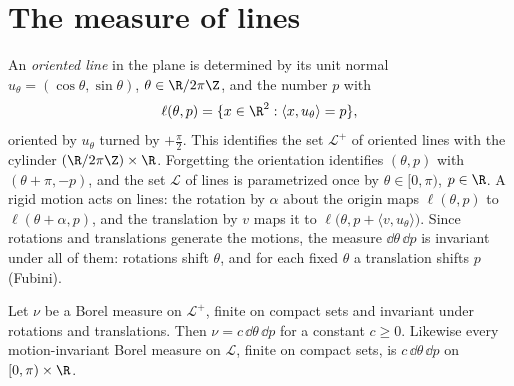 \section{The measure of lines}

An \emph{oriented line} in the plane is determined by its unit normal $u_\theta=(\cos\theta,\sin\theta)$, $\theta\in\R/2\pi\Z$, and the number $p$ with
\[\ell(\theta,p)=\{x\in\R^2:\langle x,u_\theta\rangle=p\},\]
oriented by $u_\theta$ turned by $+\frac\pi2$. This identifies the set $\mathcal L^+$ of oriented lines with the cylinder $(\R/2\pi\Z)\times\R$. Forgetting the orientation identifies
$(\theta,p)$ with $(\theta+\pi,-p)$, and the set $\mathcal L$ of lines is parametrized once by $\theta\in[0,\pi)$, $p\in\R$. A rigid motion acts on lines: the rotation by $\alpha$ about the
origin maps $\ell(\theta,p)$ to $\ell(\theta+\alpha,p)$, and the translation by $v$ maps it to $\ell\bigl(\theta,p+\langle v,u_\theta\rangle\bigr)$. Since rotations and translations generate the
motions, the measure $\dd\theta\,\dd p$ is invariant under all of them: rotations shift $\theta$, and for each fixed $\theta$ a translation shifts $p$ (Fubini).

\begin{theorem}\label{thm:linesunique}
Let $\nu$ be a Borel measure on $\mathcal L^+$, finite on compact sets and invariant under rotations and translations. Then $\nu=c\,\dd\theta\,\dd p$ for a constant $c\ge0$. Likewise every
motion-invariant Borel measure on $\mathcal L$, finite on compact sets, is $c\,\dd\theta\,\dd p$ on $[0,\pi)\times\R$.
\end{theorem}

